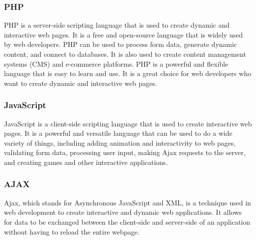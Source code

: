 \documentclass{article}
\begin{document}
\subsubsection{PHP}
PHP is a server-side scripting language that is used to create dynamic and interactive web pages. It is a free and open-source language that is widely used by web developers. PHP can be used to process form data, generate dynamic content, and connect to databases. It is also used to create content management systems (CMS) and e-commerce platforms.
PHP is a powerful and flexible language that is easy to learn and use. It is a great choice for web developers who want to create dynamic and interactive web pages.
\subsubsection{JavaScript}
JavaScript is a client-side scripting language that is used to create interactive web pages. It is a powerful and versatile language that can be used to do a wide variety of things, including adding animation and interactivity to web pages, validating form data, processing user input, making Ajax requests to the server, and creating games and other interactive applications.
\subsubsection{AJAX}
Ajax, which stands for Asynchronous JavaScript and XML, is a technique used in web development to create interactive and dynamic web applications. It allows for data to be exchanged between the client-side and server-side of an application without having to reload the entire webpage.
\end{document}
